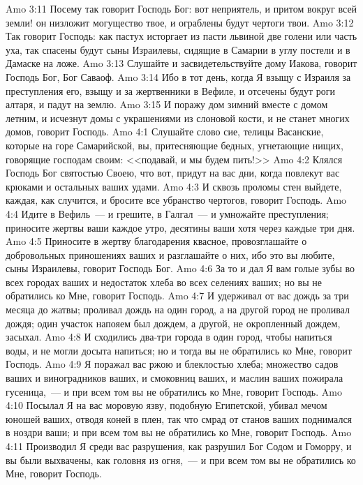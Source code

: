 \vs Amo 3:11 Посему так говорит Господь Бог: вот неприятель, и притом вокруг всей земли! он низложит могущество твое, и ограблены будут чертоги твои.
\vs Amo 3:12 Так говорит Господь: как  пастух исторгает из пасти львиной две голени или часть уха, так спасены будут сыны Израилевы, сидящие в Самарии в углу постели и в Дамаске на ложе.
\vs Amo 3:13 Слушайте и засвидетельствуйте дому Иакова, говорит Господь Бог, Бог Саваоф.
\vs Amo 3:14 Ибо в тот день, когда Я взыщу с Израиля за преступления его, взыщу и за жертвенники в Вефиле, и отсечены будут роги алтаря, и падут на землю.
\vs Amo 3:15 И поражу дом зимний вместе с домом летним, и исчезнут домы с украшениями из слоновой кости, и не станет многих домов, говорит Господь.
\vs Amo 4:1 Слушайте слово сие, телицы Васанские, которые на горе Самарийской, вы, притесняющие бедных, угнетающие нищих, говорящие господам своим: <<подавай, и мы будем пить!>>
\vs Amo 4:2 Клялся Господь Бог святостью Своею, что вот, придут на вас дни, когда повлекут вас крюками и остальных ваших удами.
\vs Amo 4:3 И сквозь проломы стен выйдете, каждая, как случится, и бросите все убранство чертогов, говорит Господь.
\vs Amo 4:4 Идите в Вефиль~--- и грешите, в Галгал~--- и умножайте преступления; приносите жертвы ваши каждое утро, десятины ваши хотя через каждые три дня.
\vs Amo 4:5 Приносите в жертву благодарения квасное, провозглашайте о добровольных приношениях ваших и разглашайте о них, ибо это вы любите, сыны Израилевы, говорит Господь Бог.
\vs Amo 4:6 За то и дал Я вам голые зубы во всех городах ваших и недостаток хлеба во всех селениях ваших; но вы не обратились ко Мне, говорит Господь.
\vs Amo 4:7 И удерживал от вас дождь за три месяца до жатвы; проливал дождь на один город, а на другой город не проливал дождя; один участок напояем был дождем, а другой, не окропленный дождем, засыхал.
\vs Amo 4:8 И сходились два-три города в один город, чтобы напиться воды, и не могли досыта напиться; но и тогда вы не обратились ко Мне, говорит Господь.
\vs Amo 4:9 Я поражал вас ржою и блеклостью хлеба; множество садов ваших и виноградников ваших, и смоковниц ваших, и маслин ваших пожирала гусеница,~--- и при всем том вы не обратились ко Мне, говорит Господь.
\vs Amo 4:10 Посылал Я на вас моровую язву, подобную Египетской, убивал мечом юношей ваших, отводя коней в плен, так что смрад от станов ваших поднимался в ноздри ваши; и при всем том вы не обратились ко Мне, говорит Господь.
\vs Amo 4:11 Производил Я среди вас разрушения, как разрушил Бог Содом и Гоморру, и вы были выхвачены, как головня из огня,~--- и при всем том вы не обратились ко Мне, говорит Господь.
